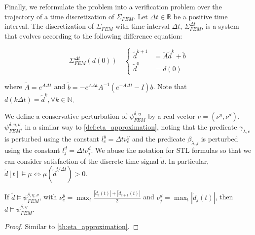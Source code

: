 \documentclass[oribibl]{llncs/llncs}
\newcommand*{\R}{\mathbb{R}}
\newcommand*{\N}{\mathbb{N}}
\newcommand{\Always}{\mathbf{G}}
\begin{document}
Finally, we reformulate the problem into a verification problem over the
trajectory of a time discretization of $\Sigma_{FEM}$. Let $\Delta t \in \R$ be
a positive time interval. The discretization of $\Sigma_{FEM}$ with time
interval $\Delta t$, $\Sigma^{\Delta t}_{FEM}$, is a system that evolves
according to the following difference equation:

\begin{equation}
    \label{eq:disc_system}
    \Sigma_{FEM}^{\Delta t}(d(0)) \quad \left\{
    \begin{aligned}
        \tilde d^{k+1} &= \tilde A \tilde d^k + \tilde b \\
        \tilde d^0 &= d(0)
    \end{aligned}
    \right.
\end{equation}

where $\tilde A = e^{A \Delta t}$ and $\tilde b = - e^{A \Delta t} A^{-1} \left
( e^{- A \Delta t} - I \right ) b$. Note that $d(k \Delta t) = \tilde d^k,
\forall k \in \N$. 

We define a conservative perturbation of $\psi^{\delta, \eta}_{FEM}$ by a real
vector $\nu = (\nu^y, \nu^d)$, $\psi^{\delta, \eta, \nu}_{FEM}$, in a similar
way to \cref{def:eta_approximation}, noting that the predicate $\gamma_{\lambda, e}$ is perturbed
using the constant $l_e^y = \Delta t \nu^y_e$ and the predicate $\beta_{\lambda, j}$ is
perturbed using the constant $l_j^d = \Delta t \nu^d_j$. We abuse the notation
for STL formulas so that we can consider satisfaction of the discrete time
signal $\tilde{d}$. In particular, $\tilde{d}[t] \models \mu \iff
\mu(\tilde{d}^{t / \Delta t}) > 0$.

\begin{theorem}
    \label{th:nu_approximation}
    If $\tilde d \models \psi^{\delta, \eta, \nu}_{FEM}$, with
    $\nu^y_e = \max_t \frac{|\dot d_e(t)| + |\dot d_{e+1}(t)|}{2}$ and $\nu^d_j = \max_t
    |\dot d_j(t)|$, then $d \models \psi^{\delta, \eta}_{FEM}$.
\end{theorem}
\begin{proof}
    Similar to \cref{th:eta_approximation}.
\end{proof}
\end{document}

